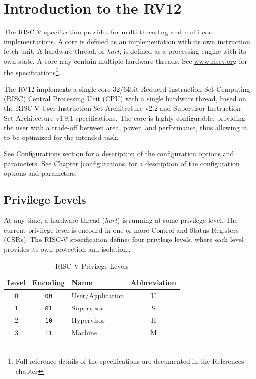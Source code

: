 \chapter{Introduction to the RV12} \label{introduction-to-the-rv12}

The RISC-V specification provides for multi-threading and multi-core
implementations.  A core is defined as an implementation with its own
instruction fetch unit.  A hardware thread, or \emph{hart}, is defined as a
processing engine with its own state.  A core may contain multiple hardware
threads.  See \href{http://www.riscv.org}{www.riscv.org} for the
specifications\footnote{Full reference details of the specifications are
documented in the References chapter}.

The RV12 implements a single core 32/64bit Reduced Instruction Set Computing
(RISC) Central Processing Unit (CPU) with a single hardware thread, based on
the RISC-V User Instruction Set Architecture v2.2 and Supervisor Instruction
Set Architecture v1.9.1 specifications.  The core is highly configurable,
providing the user with a trade-off between area, power, and performance, thus
allowing it to be optimized for the intended task.

\ifdefined\MARKDOWN
	See Configurations section for a description of the configuration options and parameters.
\else
	See Chapter \ref{configurations} for a description of the configuration options and parameters.
\fi

\section{Privilege Levels}\label{privilege-levels}

At any time, a hardware thread (\emph{hart}) is running at some privilege
level.  The current privilege level is encoded in one or more Control and
Status Registers (CSRs).  The RISC-V specification defines four privilege
levels, where each level provides its own protection and isolation..

\begin{longtable}[]{@{}cclc@{}}
\toprule
	Level & Encoding    & Name             & Abbreviation\tabularnewline
\midrule
\endhead
	0     & \texttt{00} & User/Application & U\tabularnewline
	1     & \texttt{01} & Supervisor       & S\tabularnewline
	2     & \texttt{10} & Hypervisor       & H\tabularnewline
	3     & \texttt{11} & Machine          & M\tabularnewline
\bottomrule
\caption{RISC-V Privilege Levels}
\label{tab:riscv-priv-levels}
\end{longtable}

